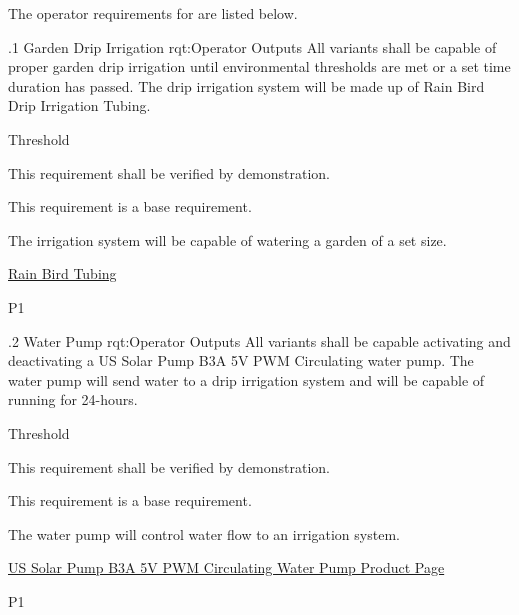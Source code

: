 The operator requirements for \ThisSystem are listed below.

\ONERQMTVKPP
{\RqtNumberBase.1}
{Garden Drip Irrigation}
{rqt:Operator Outputs}
{All \ThisSys variants shall be capable of proper garden drip irrigation until environmental thresholds are met or a set time duration has passed. The drip irrigation system will be made up of Rain Bird Drip Irrigation Tubing.}
{
	\item [All Phases] Threshold
}
{This requirement shall be verified by demonstration.}
{
	\item [N/A] This requirement is a base requirement.
}
{
  \item The irrigation system will be capable of watering a garden of a set size.
  \item \href{https://www.homedepot.com/p/Rain-Bird-1-2-in-0-71-in-O-D-x-100-ft-Distribution-Tubing-for-Drip-Irrigation-T70-100S/204751445}{Rain Bird Tubing}
}
{P1}

\ONERQMTVKPP
{\RqtNumberBase.2}
{Water Pump}
{rqt:Operator Outputs}
{All \ThisSys variants shall be capable activating and deactivating a US Solar Pump B3A 5V PWM Circulating water pump. The water pump will send water to a drip irrigation system and will be capable of running for 24-hours.}
{
	\item [All Phases] Threshold
}
{This requirement shall be verified by demonstration.}
{
	\item [N/A] This requirement is a base requirement.
}
{
  \item The water pump will control water flow to an irrigation system.
  \item \href{https://www.ussolarpumps.com/catalog/5v-pwm-wired-pumps/b3a-5v-pwm-circulating-pump/}{US Solar Pump B3A 5V PWM Circulating Water Pump Product Page}
}
{P1}

